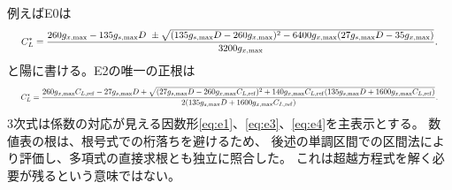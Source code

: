 \documentclass[a4paper,11pt]{ltjsarticle}
\begin{document}
例えばE0は
\begin{equation}\label{eq:e0root}
\resizebox{.98\linewidth}{!}{$\displaystyle
 C_L^*=
 \frac{260g_{x,\max}-135g_{s,\max}D
 \ \pm\sqrt{(135g_{s,\max}D-260g_{x,\max})^2
             -6400g_{x,\max}(27g_{s,\max}D-35g_{x,\max})}}
 {3200g_{x,\max}} .$}
\end{equation}
と陽に書ける。E2の唯一の正根は
\begin{equation}\label{eq:e2root}
\resizebox{.98\linewidth}{!}{$\displaystyle
 C_L^*=
 \frac{260g_{x,\max}C_{L,\mathrm{ref}}-27g_{s,\max}D
 +\sqrt{(27g_{s,\max}D-260g_{x,\max}C_{L,\mathrm{ref}})^2
 +140g_{x,\max}C_{L,\mathrm{ref}}
 (135g_{s,\max}D+1600g_{x,\max}C_{L,\mathrm{ref}})}}
 {2(135g_{s,\max}D+1600g_{x,\max}C_{L,\mathrm{ref}})} .$}
\end{equation}
3次式は係数の対応が見える因数形\eqref{eq:e1}、\eqref{eq:e3}、\eqref{eq:e4}を主表示とする。
数値表の根は、根号式での桁落ちを避けるため、
後述の単調区間での区間法により評価し、多項式の直接求根とも独立に照合した。
これは超越方程式を解く必要が残るという意味ではない。
\end{document}
